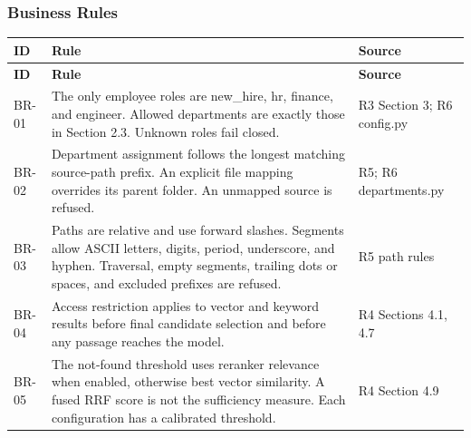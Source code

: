 \documentclass[11pt,letterpaper]{article}
\begin{document}
\subsubsection{Business Rules}

\begingroup\small

\begin{longtable}{|P{\arrayrulewidth\relax}|P{\arrayrulewidth\relax}|P{\arrayrulewidth\relax}|}

\hline{}

\textbf{ID} & \textbf{Rule} & \textbf{Source} \\ \hline

\endfirsthead

\hline{}

\textbf{ID} & \textbf{Rule} & \textbf{Source} \\ \hline

\endhead

\hline\endfoot

\hline\endlastfoot

BR-01 & The only employee roles are new\_hire, hr, finance, and engineer. Allowed departments are exactly those in Section 2.3. Unknown roles fail closed. & R3 Section 3; R6 config.py \\ \hline

BR-02 & Department assignment follows the longest matching source-path prefix. An explicit file mapping overrides its parent folder. An unmapped source is refused. & R5; R6 departments.py \\ \hline

BR-03 & Paths are relative and use forward slashes. Segments allow ASCII letters, digits, period, underscore, and hyphen. Traversal, empty segments, trailing dots or spaces, and excluded prefixes are refused. & R5 path rules \\ \hline

BR-04 & Access restriction applies to vector and keyword results before final candidate selection and before any passage reaches the model. & R4 Sections 4.1, 4.7 \\ \hline

BR-05 & The not-found threshold uses reranker relevance when enabled, otherwise best vector similarity. A fused RRF score is not the sufficiency measure. Each configuration has a calibrated threshold. & R4 Section 4.9 \\ \hline


\end{longtable}
\end{document}
